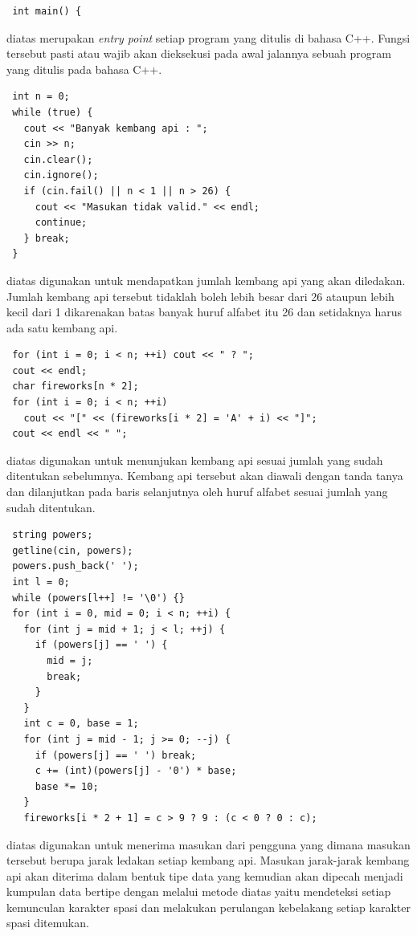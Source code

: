 \documentclass{subfiles}
\begin{document}
\begin{lstlisting}
 int main() {
\end{lstlisting}
\ilz{}{\Script} diatas merupakan \textit{entry point} setiap program yang ditulis di bahasa C++. Fungsi tersebut pasti atau wajib akan dieksekusi pada awal jalannya sebuah program yang ditulis pada bahasa C++.

\begin{lstlisting}
 int n = 0;
 while (true) {
   cout << "Banyak kembang api : ";
   cin >> n;
   cin.clear();
   cin.ignore();
   if (cin.fail() || n < 1 || n > 26) {
     cout << "Masukan tidak valid." << endl;
     continue;
   } break;
 }
\end{lstlisting}
\ilz{}{\Script} diatas digunakan untuk mendapatkan jumlah kembang api yang akan diledakan. Jumlah kembang api tersebut tidaklah boleh lebih besar dari 26 ataupun lebih kecil dari 1 dikarenakan batas banyak huruf alfabet itu 26 dan setidaknya harus ada satu kembang api.

\begin{lstlisting}
 for (int i = 0; i < n; ++i) cout << " ? ";
 cout << endl;
 char fireworks[n * 2];
 for (int i = 0; i < n; ++i)
   cout << "[" << (fireworks[i * 2] = 'A' + i) << "]";
 cout << endl << " ";
\end{lstlisting}
\ilz{}{\Script} diatas digunakan untuk menunjukan kembang api sesuai jumlah yang sudah ditentukan sebelumnya. Kembang api tersebut akan diawali dengan tanda tanya dan dilanjutkan pada baris selanjutnya oleh huruf alfabet sesuai jumlah yang sudah ditentukan.

\begin{lstlisting}
 string powers;
 getline(cin, powers);
 powers.push_back(' ');
 int l = 0;
 while (powers[l++] != '\0') {}
 for (int i = 0, mid = 0; i < n; ++i) {
   for (int j = mid + 1; j < l; ++j) {
     if (powers[j] == ' ') {
       mid = j;
       break;
     }
   }
   int c = 0, base = 1;
   for (int j = mid - 1; j >= 0; --j) {
     if (powers[j] == ' ') break;
     c += (int)(powers[j] - '0') * base;
     base *= 10;
   }
   fireworks[i * 2 + 1] = c > 9 ? 9 : (c < 0 ? 0 : c);
\end{lstlisting}
\ilz{}{\Script} diatas digunakan untuk menerima masukan dari pengguna yang dimana masukan tersebut berupa jarak ledakan setiap kembang api. Masukan jarak-jarak kembang api akan diterima dalam bentuk tipe data  yang kemudian akan dipecah menjadi kumpulan data bertipe  dengan melalui metode diatas yaitu mendeteksi setiap kemunculan karakter spasi dan melakukan perulangan kebelakang setiap karakter spasi ditemukan.
\end{document}
